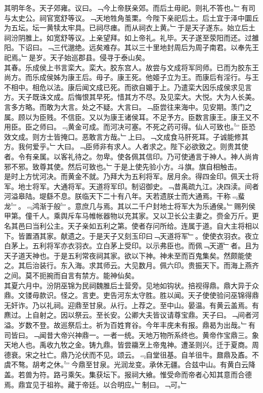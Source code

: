 \documentclass{zhvt-classic}
\begin{document}
\hspace*{2em}其明年冬。天子郊雍。议曰。﹁今上帝朕亲郊。而后土毋祀。则礼不答也。﹂有司与太史公。祠官宽舒等议。﹁天地牲角茧栗。今陛下亲祀后土。后土宜于泽中圜丘为五坛。坛一黄犊太牢具。已祠尽瘗。而从祠衣上黄。﹂于是天子遂东。始立后土祠汾阴脽上。如宽舒等议。上亲望拜。如上帝礼。礼毕。天子遂至荥阳而还。过雒阳。下诏曰。﹁三代邈绝。远矣难存。其以三十里地封周后为周子南君。以奉先王祀焉。﹂是岁。天子始巡郡县。侵寻于泰山矣。\\
\hspace*{2em}其春。乐成侯上书言栾大。栾大。胶东宫人。故尝与文成将军同师。已而为胶东王尚方。而乐成侯姊为康王后。毋子。康王死。他姬子立为王。而康后有淫行。与王不相中。相危以法。康后闻文成已死。而欲自媚于上。乃遣栾大因乐成侯求见言方。天子既诛文成。后悔恨其早死。惜其方不尽。及见栾大。大悦。大为人长美。言多方略。而敢为大言。处之不疑。大言曰。﹁臣尝往来海中。见安期。羡门之属。顾以为臣贱。不信臣。又以为康王诸侯耳。不足予方。臣数言康王。康王又不用臣。臣之师曰。﹃黄金可成。而河决可塞。不死之药可得。仙人可致也。﹄臣恐效文成。则方士皆掩口。恶敢言方哉。﹂上曰。﹁文成食马肝死耳。子诚能修其方。我何爱乎。﹂大曰。﹁臣师非有求人。人者求之。陛下必欲致之。则贵其使者。令有亲属。以客礼待之。勿卑。使各佩其信印。乃可使通言于神人。神人尚肯邪不邪。致尊其使。然后可致也。﹂于是上使先验小方。斗旗。旗自相触击。\\
\hspace*{2em}是时上方忧河决。而黄金不就。乃拜大为五利将军。居月余。得四金印。佩天士将军。地士将军。大通将军。天道将军印。制诏御史。﹁昔禹疏九江。决四渎。间者河溢皋陆。堤繇不息。朕临天下二十有八年。天若遗朕士而大通焉。干称﹃蜚龙﹄。﹃鸿渐于般﹄。意庶几与焉。其以二千户封地士将军大为乐通侯。﹂赐列侯甲第。僮千人。乘舆斥车马帷帐器物以充其家。又以卫长公主妻之。赍金万斤。更名其邑曰当利公主。天子亲如五利之第。使者存问所给。连属于道。自大主将相以下。皆置酒其家。献遗之。于是天子又刻玉印曰﹁天道将军﹂。使使衣羽衣。夜立白茅上。五利将军亦衣羽衣。立白茅上受印。以示弗臣也。而佩﹁天道﹂者。且为天子道天神也。于是五利常夜祠其家。欲以下神。神未至而百鬼集矣。然颇能使之。其后治装行。东入海。求其师云。大见数月。佩六印。贵振天下。而海上燕齐之间。莫不扼捥而自言有禁方。能神仙矣。\\
\hspace*{2em}其夏六月中。汾阴巫锦为民祠魏脽后土营旁。见地如钩状。掊视得鼎。鼎大异于众鼎。文镂毋款识。怪之。言吏。吏告河东太守胜。胜以闻。天子使使验问巫锦得鼎无奸诈。乃以礼祠。迎鼎至甘泉。从行。上荐之。至中山。晏温。有黄云盖焉。有麃过。上自射之。因以祭云。至长安。公卿大夫皆议请尊宝鼎。天子曰。﹁间者河溢。岁数不登。故巡祭后土。祈为百姓育谷。今年丰庑未有报。鼎曷为出哉。﹂有司皆曰。﹁闻昔大帝兴神鼎一。一者一统。天地万物所系终也。黄帝作宝鼎三。象天地人也。禹收九牧之金。铸九鼎。皆尝鬺烹上帝鬼神。遭圣则兴。迁于夏商。周德衰。宋之社亡。鼎乃沦伏而不见。颂云。﹃自堂徂基。自羊徂牛。鼐鼎及鼒。不虞不骜。胡考之休。﹄今鼎至甘泉。光润龙变。承休无疆。合兹中山。有黄白云降盖。若兽为符。路弓乘矢。集获坛下。报祠大飨。惟受命而帝者心知其意而合德焉。鼎宜见于祖祢。藏于帝廷。以合明应。﹂制曰。﹁可。﹂\\
\end{document}
